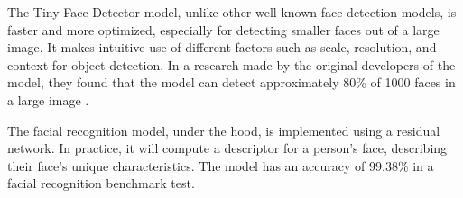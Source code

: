 The Tiny Face Detector model, unlike other well-known face detection models, is faster and more optimized, especially for detecting smaller faces out of a large image.
It makes intuitive use of different factors such as scale, resolution, and context for object detection.
In a research made by the original developers of the model, they found that the model can detect approximately 80\% of 1000 faces in a large image \cite{Hu_2017_CVPR}.

The facial recognition model, under the hood, is implemented using a residual network.
In practice, it will compute a descriptor for a person's face, describing their face's unique characteristics.
The model has an accuracy of 99.38\% in a facial recognition benchmark test.
